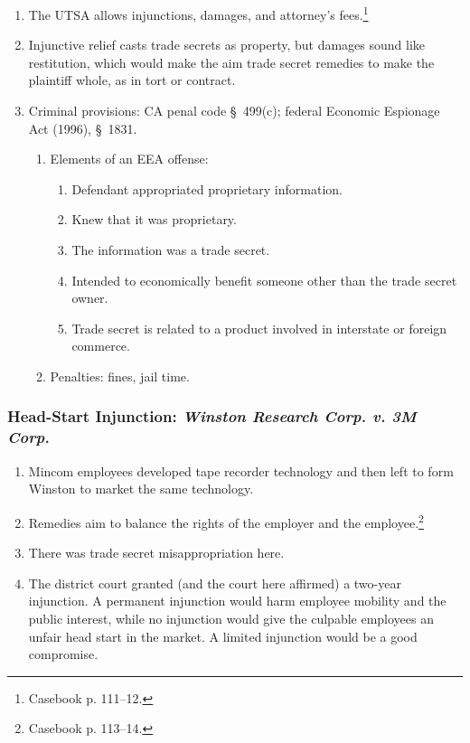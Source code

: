 \begin{enumerate}
    \item The UTSA allows injunctions, damages, and attorney's 
    fees.\footnote{Casebook p. 111--12.}
    \item Injunctive relief casts trade secrets as property, but damages sound 
    like restitution, which would make the aim trade secret remedies to make 
    the plaintiff whole, as in tort or contract.
    \item Criminal provisions: CA penal code \S\ 499(c); federal Economic 
    Espionage Act (1996), \S\ 1831.
    \begin{enumerate}
        \item Elements of an EEA offense:
        \begin{enumerate}
            \item Defendant appropriated proprietary information.
            \item Knew that it was proprietary.
            \item The information was a trade secret.
            \item Intended to economically benefit someone other than the 
            trade secret owner.
            \item Trade secret is related to a product involved in interstate 
            or foreign commerce.
        \end{enumerate}
        \item Penalties: fines, jail time.
    \end{enumerate}
\end{enumerate}

\subsubsection{Head-Start Injunction: \emph{Winston Research Corp. v. 3M Corp.}}

\begin{enumerate}
    \item Mincom employees developed tape recorder technology and then left to 
    form Winston to market the same technology.
    \item Remedies aim to balance the rights of the employer and the 
    employee.\footnote{Casebook p. 113--14.}
    \item There was trade secret misappropriation here.
    \item The district court granted (and the court here affirmed) a two-year 
    injunction. A permanent injunction would harm employee mobility and the 
    public interest, while no injunction would give the culpable employees an 
    unfair head start in the market. A limited injunction would be a good 
    compromise.
\end{enumerate}
